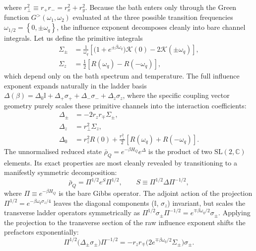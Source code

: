 where $r_\perp^2 \equiv r_+ r_- = r_x^2 + r_y^2$. Because the bath enters only through the Green function $G^{>}(\omega_1,\omega_2)$ evaluated at the three possible transition frequencies $\omega_{1/2} =\left\{0,\pm\omega_q\right\}$, the influence exponent decomposes cleanly into bare channel integrals. Let us define the primitive integrals
\begin{align}
    \Sigma_\pm &= \frac{1}{\omega_q}\!\left[\big(1+e^{\pm\beta\omega_q}\big)\mathcal{K}(0)-2\mathcal{K}(\pm\omega_q)\right], \label{eq:primitive_Sigma_pm} \\
    \Sigma_z &= \frac{1}{2}\!\left[R(\omega_q)-R(-\omega_q)\right], \label{eq:primitive_Sigma_z}
\end{align}
which depend only on the bath spectrum and temperature. The full influence exponent expands naturally in the ladder basis $\Delta(\beta) = \Delta_0\mathbb{I} + \Delta_+\sigma_+ + \Delta_-\sigma_- + \Delta_z\sigma_z$, where the specific coupling vector geometry purely scales these primitive channels into the interaction coefficients:
\begin{align}
    \Delta_\pm &= -2r_z r_\mp \Sigma_\pm, \label{eq:Delta_plus_expanded} \\
    \Delta_z &= r_\perp^2 \Sigma_z, \label{eq:Delta_z_expanded} \\
    \Delta_0 &= r_z^2 R(0) +\frac{r_\perp^2}{2}\!\left[R(\omega_q)+R(-\omega_q)\right].
\end{align}
The unnormalised reduced state $\bar\rho_Q=e^{-\beta H_Q}e^{\Delta}$ is the product of two $\mathrm{SL}(2,\mathbb{C})$ elements. Its exact properties are most cleanly revealed by transitioning to a manifestly symmetric decomposition:
\begin{equation}
    \bar{\rho}_Q = \Pi^{1/2} e^S \Pi^{1/2}, \qquad S \equiv \Pi^{1/2} \Delta \Pi^{-1/2},
    \label{eq:rho_symmetric_decomp}
\end{equation}
where $\Pi \equiv e^{-\beta H_Q}$ is the bare Gibbs operator. The adjoint action of the projection $\Pi^{1/2} = e^{-\beta\omega_q\sigma_z/4}$ leaves the diagonal components ($\mathbb{I}$, $\sigma_z$) invariant, but scales the transverse ladder operators symmetrically as $\Pi^{1/2} \sigma_\pm \Pi^{-1/2} = e^{\mp \beta\omega_q/2} \sigma_\pm$. Applying the projection to the transverse section of the raw influence exponent shifts the prefactors exponentially:
\begin{equation}
    \Pi^{1/2} \big( \Delta_\pm \sigma_\pm \big) \Pi^{-1/2} = -r_z r_\mp \big( 2 e^{\mp \beta\omega_q/2}\Sigma_\pm\big) \sigma_\pm.
\end{equation}
